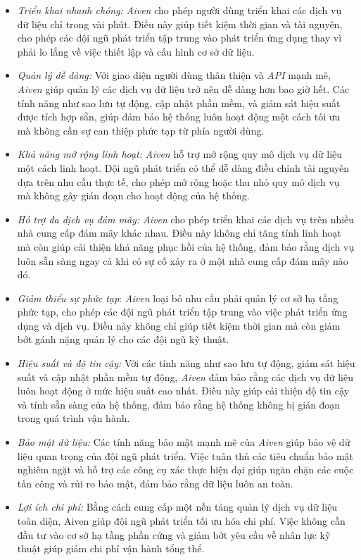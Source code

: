\begin{itemize}
    \item \textit{Triển khai nhanh chóng:} \textit{Aiven} cho phép người dùng triển khai các dịch vụ dữ liệu chỉ trong vài phút. Điều này giúp tiết kiệm thời gian và tài nguyên, cho phép các đội ngũ phát triển tập trung vào phát triển ứng dụng thay vì phải lo lắng về việc thiết lập và cấu hình cơ sở dữ liệu.
    \item \textit{Quản lý dễ dàng:} Với giao diện người dùng thân thiện và \textit{API} mạnh mẽ, \textit{Aiven} giúp quản lý các dịch vụ dữ liệu trở nên dễ dàng hơn bao giờ hết. Các tính năng như sao lưu tự động, cập nhật phần mềm, và giám sát hiệu suất được tích hợp sẵn, giúp đảm bảo hệ thống luôn hoạt động một cách tối ưu mà không cần sự can thiệp phức tạp từ phía người dùng.
    \item \textit{Khả năng mở rộng linh hoạt:} \textit{Aiven} hỗ trợ mở rộng quy mô dịch vụ dữ liệu một cách linh hoạt. Đội ngũ phát triển có thể dễ dàng điều chỉnh tài nguyên dựa trên nhu cầu thực tế, cho phép mở rộng hoặc thu nhỏ quy mô dịch vụ mà không gây gián đoạn cho hoạt động của hệ thống.
    \item \textit{Hỗ trợ đa dịch vụ đám mây:} \textit{Aiven} cho phép triển khai các dịch vụ trên nhiều nhà cung cấp đám mây khác nhau. Điều này không chỉ tăng tính linh hoạt mà còn giúp cải thiện khả năng phục hồi của hệ thống, đảm bảo rằng dịch vụ luôn sẵn sàng ngay cả khi có sự cố xảy ra ở một nhà cung cấp đám mây nào đó.
    \item \textit{Giảm thiểu sự phức tạp}: \textit{Aiven} loại bỏ nhu cầu phải quản lý cơ sở hạ tầng phức tạp, cho phép các đội ngũ phát triển tập trung vào việc phát triển ứng dụng và dịch vụ. Điều này không chỉ giúp tiết kiệm thời gian mà còn giảm bớt gánh nặng quản lý cho các đội ngũ kỹ thuật.
    \item \textit{Hiệu suất và độ tin cậy:} Với các tính năng như sao lưu tự động, giám sát hiệu suất và cập nhật phần mềm tự động, \textit{Aiven} đảm bảo rằng các dịch vụ dữ liệu luôn hoạt động ở mức hiệu suất cao nhất. Điều này giúp cải thiện độ tin cậy và tính sẵn sàng của hệ thống, đảm bảo rằng hệ thống không bị gián đoạn trong quá trình vận hành.
    \item \textit{Bảo mật dữ liệu:} Các tính năng bảo mật mạnh mẽ của \textit{Aiven} giúp bảo vệ dữ liệu quan trọng của đội ngũ phát triển. Việc tuân thủ các tiêu chuẩn bảo mật nghiêm ngặt và hỗ trợ các công cụ xác thực hiện đại giúp ngăn chặn các cuộc tấn công và rủi ro bảo mật, đảm bảo rằng dữ liệu luôn an toàn.
    \item \textit{Lợi ích chi phí:} Bằng cách cung cấp một nền tảng quản lý dịch vụ dữ liệu toàn diện, Aiven giúp đội ngũ phát triển tối ưu hóa chi phí. Việc không cần đầu tư vào cơ sở hạ tầng phần cứng và giảm bớt yêu cầu về nhân lực kỹ thuật giúp giảm chi phí vận hành tổng thể.
\end{itemize}
